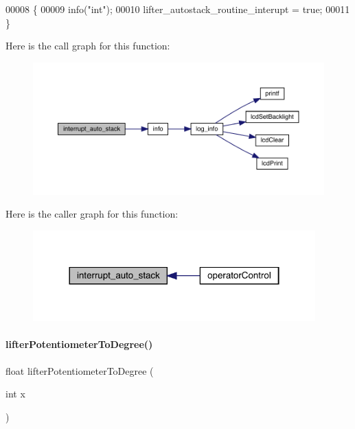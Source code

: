 \begin{DoxyCode}
00008                                        \{
00009   info(\textcolor{stringliteral}{"int"});
00010   lifter_autostack_routine_interupt = \textcolor{keyword}{true};
00011 \}
\end{DoxyCode}
Here is the call graph for this function\+:
\nopagebreak
\begin{figure}[H]
\begin{center}
\leavevmode
\includegraphics[width=350pt]{lifter_8h_a3738d33dc870f98243a93bddd855b43e_cgraph}
\end{center}
\end{figure}
Here is the caller graph for this function\+:
\nopagebreak
\begin{figure}[H]
\begin{center}
\leavevmode
\includegraphics[width=308pt]{lifter_8h_a3738d33dc870f98243a93bddd855b43e_icgraph}
\end{center}
\end{figure}
\mbox{\label{lifter_8h_ab0460888f3213e5510bd25ae1e152a75}} 
\paragraph{lifter\+Potentiometer\+To\+Degree()}
{\footnotesize\ttfamily float lifter\+Potentiometer\+To\+Degree (\begin{DoxyParamCaption}\item[{int}]{x }\end{DoxyParamCaption})}



